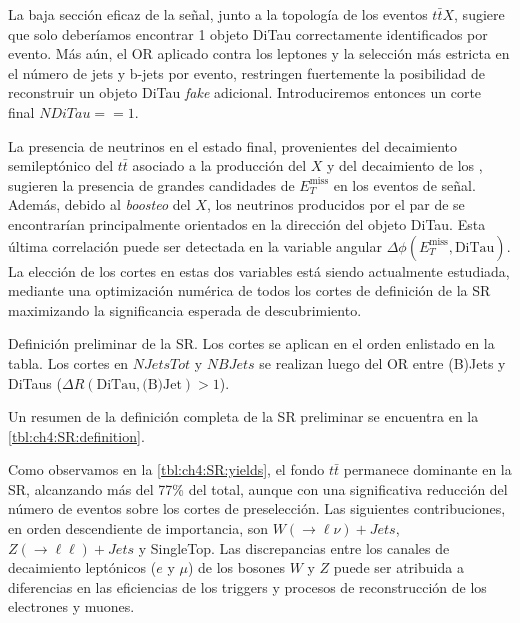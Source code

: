 La baja sección eficaz de la señal, junto a la topología de los eventos $t\bar{t}X$, sugiere que solo deberíamos encontrar 1 objeto DiTau correctamente identificados por evento. Más aún, el OR aplicado contra los leptones y la selección más estricta en el número de jets y b-jets por evento, restringen fuertemente la posibilidad de reconstruir un objeto DiTau \textit{fake} adicional. Introduciremos entonces un corte final $NDiTau == 1$.

La presencia de neutrinos en el estado final, provenientes del decaimiento semileptónico del $t\bar{t}$ asociado a la producción del $X$ y del decaimiento de los \thads, sugieren la presencia de grandes candidades de $E_T^{\text{miss}}$ en los eventos de señal. Además, debido al \textit{boosteo} del $X$, los neutrinos producidos por el par de \thads se encontrarían principalmente orientados en la dirección del objeto DiTau. Esta última correlación puede ser detectada en la variable angular $\Delta\phi(E_T^{\text{miss}}, \text{DiTau})$. La elección de los cortes en estas dos variables está siendo actualmente estudiada, mediante una optimización numérica de todos los cortes de definición de la SR maximizando la significancia esperada de descubrimiento.

\begin{margintable}[-5em]
    
    \caption{Definición preliminar de la SR. Los cortes se aplican en el orden enlistado en la tabla. Los cortes en $NJetsTot$ y $NBJets$ se realizan luego del OR entre (B)Jets y DiTaus ($\Delta R(\text{DiTau}, \text{(B)Jet}) > 1$).}
    \label{tbl:ch4:SR:definition}
\end{margintable}

Un resumen de la definición completa de la SR preliminar se encuentra en la \cref{tbl:ch4:SR:definition}.

 \label{sec:ch4:SR:results}

Como observamos en la \cref{tbl:ch4:SR:yields}, el fondo $t\bar{t}$ permanece dominante en la SR, alcanzando más del 77\% del total, aunque con una significativa reducción del número de eventos sobre los cortes de preselección. Las siguientes contribuciones, en orden descendiente de importancia, son $W(\to\ell\nu) + Jets$, $Z(\to\ell\ell) + Jets$ y SingleTop. Las discrepancias entre los canales de decaimiento leptónicos ($e$ y $\mu$) de los bosones $W$ y $Z$ puede ser atribuida a diferencias en las eficiencias de los triggers y procesos de reconstrucción de los electrones y muones.

